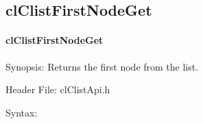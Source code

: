 \begin{flushleft}
\subsection{clClistFirstNodeGet}
\hypertarget{pagecl107}{}\paragraph{cl\-Clist\-First\-Node\-Get}\label{pagecl107}
\begin{Desc}
\item[Synopsis:]Returns the first node from the list.\end{Desc}
\begin{Desc}
\item[Header File:]clClistApi.h\end{Desc}
\begin{Desc}
\item[Syntax:]


\end{Desc}
\end{flushleft}
